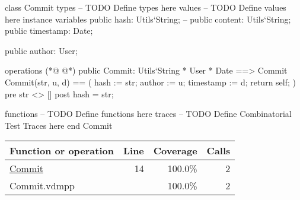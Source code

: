 \begin{vdmpp}[breaklines=true]
class Commit
 types
 -- TODO Define types here
 values
 -- TODO Define values here
 instance variables
  public hash: Utils`String;
  -- public content: Utils`String;
  public timestamp: Date;
  
  public author: User;
 
 operations
(*@
\label{Commit:14}
@*)
  public Commit: Utils`String * User * Date ==> Commit
  Commit(str, u, d) == (
   hash := str;
   author := u;
   timestamp := d;
   return self;
  )
  pre str <> []
  post hash = str;
  
 functions
 -- TODO Define functions here
 traces
 -- TODO Define Combinatorial Test Traces here
end Commit
\end{vdmpp}
\bigskip
\begin{longtable}{|l|r|r|r|}
\hline
Function or operation & Line & Coverage & Calls \\
\hline
\hline
\hyperref[Commit:14]{Commit} & 14&100.0\% & 2 \\
\hline
\hline
Commit.vdmpp & & 100.0\% & 2 \\
\hline
\end{longtable}

